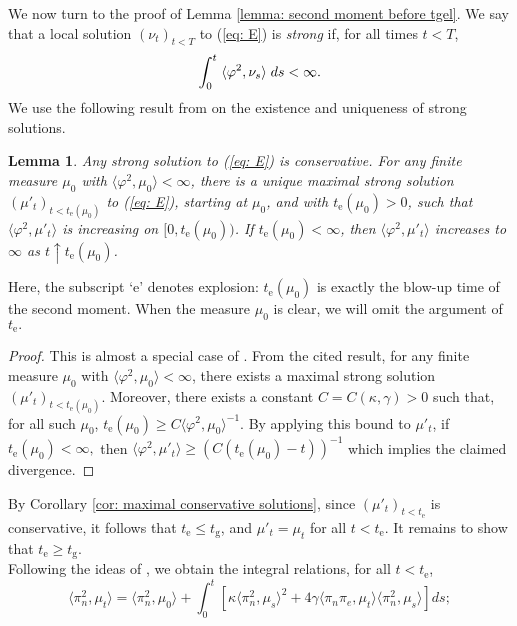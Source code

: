 \documentclass[11pt, notitlepage]{article}
\newtheorem{lem}[thm]{Lemma}
\begin{document}
We now turn to the proof of Lemma \ref{lemma: second moment before tgel}. We say that a local solution $(\nu_t)_{t<T}$ to (\ref{eq: E}) is \emph{strong} if, for all times $t<T$, 
\begin{equation}
    \int_0^t  \hspace{0.1cm} \langle\varphi^2, \nu_s\rangle  \hspace{0.1cm} ds<\infty.
\end{equation} We use the following result from \cite{N00} on the existence and uniqueness of strong solutions. 
\begin{lem}\label{lemma: strong solutions} Any strong solution to (\ref{eq: E}) is conservative. For any finite measure $\mu_0$ with $\langle \varphi^2, \mu_0\rangle <\infty$, there is a unique maximal strong solution $(\mu'_t)_{t<t_\mathrm{e}(\mu_0)}$ to (\ref{eq: E}), starting at $\mu_0$, and with $t_\mathrm{e}(\mu_0)>0$, such that $ \langle \varphi^2, \mu'_t\rangle$ is increasing on $[0,t_\mathrm{e}(\mu_0))$. If $t_\mathrm{e}(\mu_0)<\infty$, then $\langle \varphi^2, \mu'_t\rangle$ increases to $\infty$  as $t\uparrow t_\mathrm{e}(\mu_0)$.  \end{lem} Here, the subscript `e' denotes explosion: $t_\mathrm{e}(\mu_0)$ is exactly the blow-up time of the second moment. When the measure $\mu_0$ is clear, we will omit the argument of $t_\mathrm{e}.$ 
\begin{proof}
    This is almost a special case of \cite[Theorem 2.1]{N00}. From the cited result, for any finite measure $\mu_0$ with $\langle \varphi^2, \mu_0\rangle <\infty$, there exists a maximal strong solution $(\mu'_t)_{t<t_\mathrm{e}(\mu_0)}$. Moreover, there exists a constant $C=C(\kappa, \gamma)>0$ such that, for all such $\mu_0$,  $t_\mathrm{e}(\mu_0) \ge C \langle \varphi^2, \mu_0\rangle^{-1}$. By applying this bound to $\mu'_t$, if $t_\mathrm{e}(\mu_0)<\infty,$ then $\langle \varphi^2, \mu'_t\rangle \ge (C(t_\mathrm{e}(\mu_0)-t))^{-1}$  which implies the claimed divergence.
\end{proof}

By Corollary \ref{cor: maximal conservative solutions}, since $(\mu'_t)_{t<t_\mathrm{e}}$ is conservative, it follows that $t_\mathrm{e} \le t_\mathrm{g}$, and $\mu'_t=\mu_t$ for all $t<t_\mathrm{e}$. It remains to show that $t_\mathrm{e}\ge t_\mathrm{g}$. \medskip \\ Following the ideas of \cite[Proposition 2.7]{N00}, we obtain the integral relations, for all $t<t_\mathrm{e}$, \begin{equation} \label{eq: ODE1}
    \langle \pi_n^2, \mu_t\rangle =
    \langle \pi_n^2, \mu_0\rangle + \int_0^t \left[\kappa\langle \pi_n^2, \mu_s\rangle^2+4\gamma\langle \pi_n\pi_e, \mu_t\rangle\langle\pi_n^2, \mu_s\rangle \right] ds;
\end{equation} 
\end{document}
